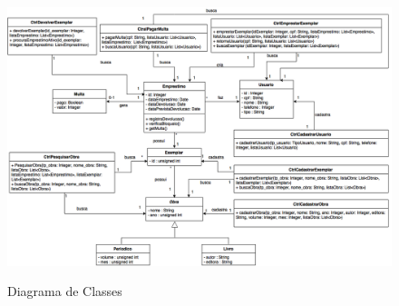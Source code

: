 \documentclass[
	12pt,				%
	openright,			%
	oneside,			%
	a4paper,			%
	english,			%
	brazil				%
	]{abntex2}
\begin{document}
\begin{figure}[H]
\includegraphics[width=1\textwidth]{DiagramaClasses}
\label{fig:figura9}
\caption{\small Diagrama de Classes}
\end{figure}



\postextual





\printindex
\end{document}
